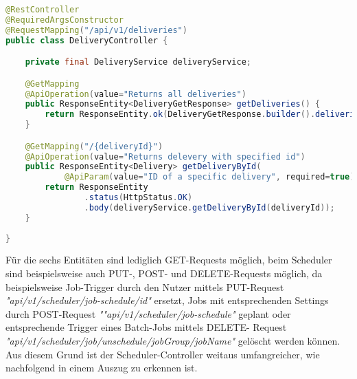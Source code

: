 \begin{lstlisting}[language=JAVA,caption= {Delivery Controller}]
@RestController
@RequiredArgsConstructor
@RequestMapping("/api/v1/deliveries")
public class DeliveryController {

    private final DeliveryService deliveryService;

    @GetMapping
    @ApiOperation(value="Returns all deliveries")
    public ResponseEntity<DeliveryGetResponse> getDeliveries() {
        return ResponseEntity.ok(DeliveryGetResponse.builder().deliveries(deliveryService.getDeliveries()).build());
    }

    @GetMapping("/{deliveryId}")
    @ApiOperation(value="Returns delevery with specified id")
    public ResponseEntity<Delivery> getDeliveryById(
    		@ApiParam(value="ID of a specific delivery", required=true)@PathVariable String deliveryId) {
        return ResponseEntity
                .status(HttpStatus.OK)
                .body(deliveryService.getDeliveryById(deliveryId));
    }
    
}
\end{lstlisting}
Für die sechs Entitäten sind lediglich GET-Requests möglich, beim Scheduler sind beispielsweise auch PUT-, POST- und DELETE-Requests möglich, da beispielsweise Job-Trigger durch den Nutzer mittels PUT-Request \textit{"\/api/v1/scheduler/job-schedule/{id}"} ersetzt, Jobs mit entsprechenden Settings durch POST-Request \textit{""\/api/v1/scheduler/job-schedule"} geplant oder entsprechende Trigger eines Batch-Jobs mittels DELETE- Request \textit{"\/api/v1/scheduler/job/unschedule/{jobGroup}/{jobName}"} gelöscht werden können. Aus diesem Grund ist der Scheduler-Controller weitaus umfangreicher, wie nachfolgend in einem Auszug zu erkennen ist. 

